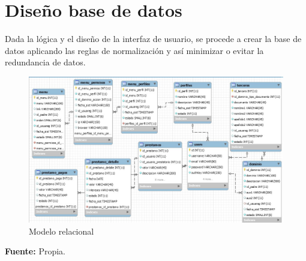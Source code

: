 \section{Diseño base de datos}

{Dada la lógica y el diseño de la interfaz de usuario, se procede a crear la base de datos aplicando las reglas de normalización y así minimizar o evitar la redundancia de datos.

\begin{figure}[H]
	\centering
	\includegraphics[width=1\linewidth]{development/modelo.png}
	\caption{Modelo relacional}
\end{figure}
\begin{center}
	\textbf{Fuente:} Propia.
\end{center}
}